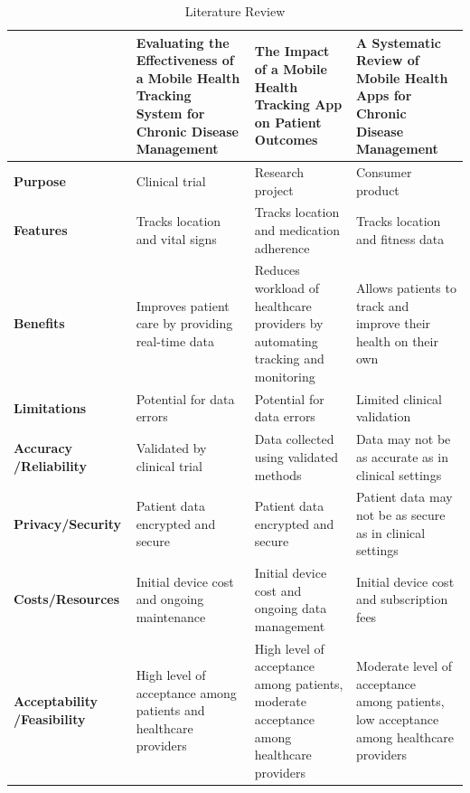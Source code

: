 \documentclass[12pt]{article}
\begin{document}
			 \newpage
			 \begin{table}[!h]
			 	\centering
			 	\caption{Literature Review}
			 	\label{Literature Review}
			 	\begin{tabular}{|p{2.6cm}|p{3.5cm}|p{3.5cm}|p{3.5cm}|} 
			 		\hline 
			 		\centering
			 		\cellcolor{lightgray}\backslashbox{diff}{Study}
			 		& 
			 			\centering\cellcolor{lightgray}\textbf{Evaluating the Effectiveness of a Mobile Health Tracking System for Chronic Disease Management}\cite{Study1}
			 		&
			 			\centering\cellcolor{lightgray} \textbf{The Impact of a Mobile Health Tracking App on Patient Outcomes}\cite{Study2}
		 			& 
		 				\cellcolor{lightgray}\textbf{A Systematic Review of Mobile Health Apps for Chronic Disease Management}\cite{Study3}\\
			 		\hline
			 		 \cellcolor{lightgray}\textbf{Purpose} & Clinical trial & Research project & Consumer product \\
			 		 \hline 
			 		 \cellcolor{lightgray}\textbf{Features} & Tracks location and vital signs & Tracks location and medication adherence & Tracks location and fitness data \\
			 		 \hline
			 		 \cellcolor{lightgray}\textbf{Benefits} & Improves patient care by providing real-time data & Reduces workload of healthcare providers by automating tracking and monitoring & Allows patients to track and improve their health on their own \\
			 		 \hline
			 		 \cellcolor{lightgray}\textbf{Limitations} & Potential for data errors & Potential for data errors & Limited clinical validation \\
			 		 \hline
			 		\cellcolor{lightgray}\textbf{Accuracy \quad/Reliability} & Validated by clinical trial & Data collected using validated methods & Data may not be as accurate as in clinical settings \\
			 		 \hline
			 		 \cellcolor{lightgray}\textbf{Privacy\qquad/Security} & Patient data encrypted and secure & Patient data encrypted and secure & Patient data may not be as secure as in clinical settings \\
			 		 \hline
			 		 \cellcolor{lightgray}\textbf{Costs\qquad/Resources} & Initial device cost and ongoing maintenance & Initial device cost and ongoing data management & Initial device cost and subscription fees \\
			 		 \hline
			 		\cellcolor{lightgray}\textbf{Acceptability \quad/Feasibility} &  High level of acceptance among patients and healthcare providers & High level of acceptance among patients, moderate acceptance among healthcare providers & Moderate level of acceptance among patients, low acceptance among healthcare providers \\
			 		 \hline
			 	\end{tabular}
			 \end{table}
\end{document}
